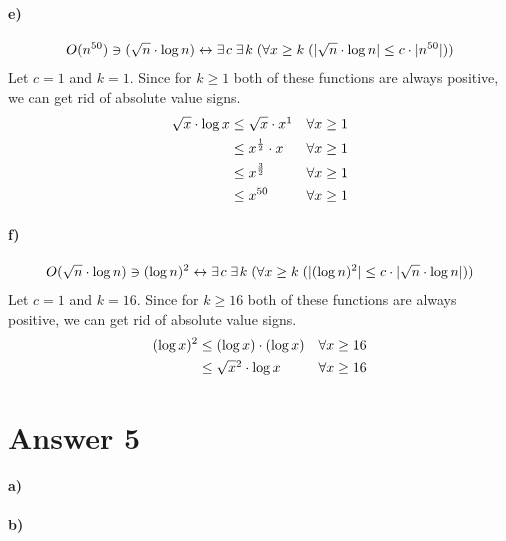 \documentclass[12pt]{article}
\newcommand\+{\mkern2mu}
\begin{document}
\paragraph{e)}
\begin{gather*}
O(n^{50}) \ni (\sqrt{n} \cdot \log{n}) \leftrightarrow \exists \+ c \; \exists \+ k \; (\forall x \geq k \; (\vert \sqrt{n} \cdot \log{n} \vert \leq c \cdot \vert n^{50} \vert))
\end{gather*}
Let $c = 1$ and $k = 1$.
Since for $k \geq 1$ both of these functions are always positive, we can get rid of absolute value signs.
\begin{align*}
\sqrt{x} \cdot \log{x} &\leq \sqrt{x} \cdot x\footnotemark && \forall x \geq 1 \\
&\leq x^{\frac{1}{2}} \cdot x && \forall x \geq 1 \\
&\leq x^{\frac{3}{2}} && \forall x \geq 1 \\
&\leq x^{50} && \forall x \geq 1
\end{align*}
\paragraph{f)}
\begin{gather*}
O(\sqrt{n} \cdot \log{n}) \ni (\log{n})^2 \leftrightarrow \exists \+ c \; \exists \+ k \; (\forall x \geq k \; (\vert (\log{n})^2 \vert \leq c \cdot \vert \sqrt{n} \cdot \log{n} \vert))
\end{gather*}
Let $c = 1$ and $k = 16$.
Since for $k \geq 16$ both of these functions are always positive, we can get rid of absolute value signs.
\begin{align*}
(\log{x})^2 &\leq (\log{x}) \cdot (\log{x}) && \forall x \geq 16 \\
&\leq \sqrt{x}\footnotemark \cdot \log{x} && \forall x \geq 16
\end{align*}

\section*{Answer 5}
\paragraph{a)}
\paragraph{b)}
\end{document}
